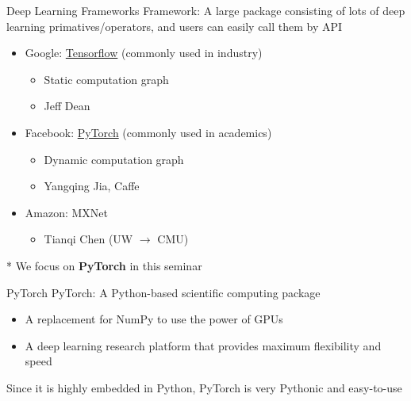 \documentclass{../TexTemplate/myslide}
\begin{document}
\begin{frame}{Deep Learning Frameworks}
Framework: A large package consisting of lots of deep learning primatives/operators, and users can easily call them by API
\begin{itemize}
	\item Google: \href{https://www.tensorflow.org/}{Tensorflow} (commonly used in industry)
	\begin{itemize}
		\item Static computation graph
		\item Jeff Dean
	\end{itemize}
	\item Facebook: \href{https://pytorch.org/}{PyTorch} (commonly used in academics)
	\begin{itemize}
		\item Dynamic computation graph
		\item Yangqing Jia, Caffe
	\end{itemize}
	\item Amazon: MXNet
	\begin{itemize}
		\item Tianqi Chen (UW $\to$ CMU)
	\end{itemize}
\end{itemize}
* We focus on \textbf{PyTorch} in this seminar
\end{frame}

\begin{frame}{PyTorch}
PyTorch: A Python-based scientific computing package
\begin{itemize}
	\item A replacement for NumPy to use the power of GPUs
	\item A deep learning research platform that provides maximum flexibility and speed
\end{itemize}
Since it is highly embedded in Python, PyTorch is very Pythonic and easy-to-use
\end{frame}
\end{document}
